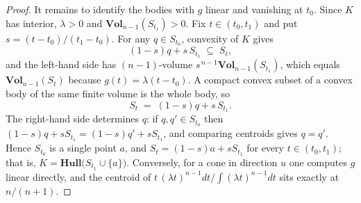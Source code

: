 \documentclass[10pt,a4paper]{amsart}
\newcommand{\Hull}{\mathbf{Hull}}
\newcommand{\Vol}{\mathbf{Vol}}
\begin{document}
\begin{proof}
It remains to identify the bodies with $g$ linear and vanishing at
$t_0$.  Since $K$ has interior, $\lambda>0$ and $\Vol_{n-1}(S_{t_1})>0$.
Fix $t\in(t_0,t_1)$ and put $s=(t-t_0)/(t_1-t_0)$.  For any $q\in S_{t_0}$,
convexity of $K$ gives
\[
  (1-s)q + s\,S_{t_1}\;\subseteq\;S_t ,
\]
and the left-hand side has $(n-1)$-volume $s^{\,n-1}\Vol_{n-1}(S_{t_1})$,
which equals $\Vol_{n-1}(S_t)$ because $g(t)=\lambda(t-t_0)$.  A compact
convex subset of a convex body of the same finite volume is the whole body,
so
\[
  S_t\;=\;(1-s)q + s\,S_{t_1}.
\]
The right-hand side determines $q$: if $q,q'\in S_{t_0}$ then
$(1-s)q+sS_{t_1}=(1-s)q'+sS_{t_1}$, and comparing centroids gives $q=q'$.
Hence $S_{t_0}$ is a single point $a$, and $S_t=(1-s)a+sS_{t_1}$ for every
$t\in(t_0,t_1)$; that is, $K=\Hull\bigl(S_{t_1}\cup\{a\}\bigr)$.
Conversely, for a cone in direction $u$ one computes $g$ linear directly,
and the centroid of
$t\,(\lambda t)^{n-1}dt/\!\int(\lambda t)^{n-1}dt$ sits exactly at
$n/(n+1)$.
\end{proof}
\end{document}
